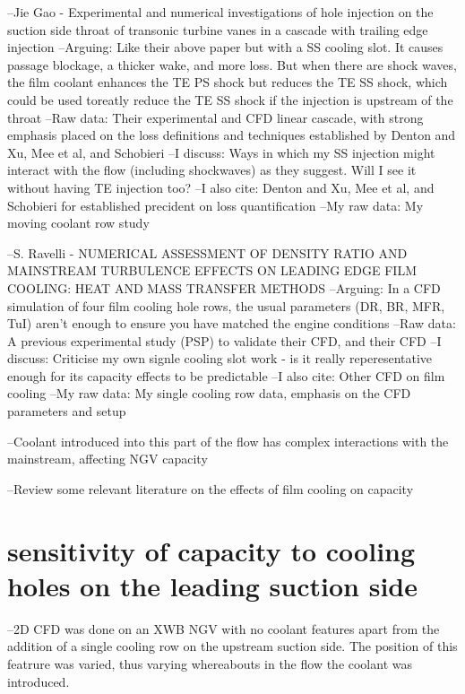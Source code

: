 \documentclass[11pt, twoside]{report}
\begin{document}
	--Jie Gao - Experimental and numerical investigations of hole injection
on the suction side throat of transonic turbine vanes in a cascade with trailing edge injection
		--Arguing: Like their above paper but with a SS cooling slot. It causes passage blockage, a thicker wake, and more loss. But when there are shock waves, the film coolant enhances the TE PS shock but reduces the TE SS shock, which could be used toreatly reduce the TE SS shock if the injection is upstream of the throat
		--Raw data: Their experimental and CFD linear cascade, with strong emphasis placed on the loss definitions and techniques established by Denton and Xu, Mee et al, and Schobieri
		--I discuss: Ways in which my SS injection might interact with the flow (including shockwaves) as they suggest. Will I see it without having TE injection too?
		--I also cite: Denton and Xu, Mee et al, and Schobieri for established precident on loss quantification
		--My raw data: My moving coolant row study
		
	--S. Ravelli - NUMERICAL ASSESSMENT OF DENSITY RATIO AND MAINSTREAM TURBULENCE EFFECTS ON LEADING EDGE FILM COOLING: HEAT AND MASS TRANSFER METHODS
		--Arguing: In a CFD simulation of four film cooling hole rows, the usual parameters (DR, BR, MFR, TuI) aren't enough to ensure you have matched the engine conditions
		--Raw data: A previous experimental study (PSP) to validate their CFD, and their CFD
		--I discuss: Criticise my own signle cooling slot work - is it really reperesentative enough for its capacity effects to be predictable
		--I also cite: Other CFD on film cooling
		--My raw data: My single cooling row data, emphasis on the CFD parameters and setup

--Coolant introduced into this part of the flow has complex interactions with the mainstream, affecting NGV capacity
 
--Review some relevant literature on the effects of film cooling on capacity






\section{sensitivity of capacity to cooling holes on the leading suction side}

--2D CFD was done on an XWB NGV with no coolant features apart from the addition of a single cooling row on the upstream suction side. The position of this featrure was varied, thus varying whereabouts in the flow the coolant was introduced.
\end{document}
